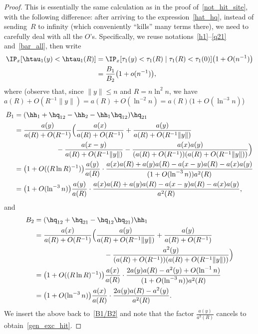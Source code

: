 \begin{proof}
This is essentially the same calculation as in the proof of~\eqref{not_hit_site}, with the following difference: after arriving to the expression~\eqref{hat_hq}, instead of sending~$R$ to infinity (which conveniently ``kills'' many terms there), we need to carefully deal with all the $O$'s. Specifically, we reuse notations~\eqref{h1}--\eqref{q21} and~\eqref{bar_all}, then write
\begin{align}
\IP_x[\htau_1(y)<\htau_1(R)] &= \IP_x[\tau_1(y)<\tau_1(R)\mid \tau_1(R)<\tau_1(0)]
\big(1+O(n^{-1})\big)\nonumber\\
&= \frac{B_1}{B_2}\big(1+o(n^{-1})\big),\label{B1/B2}
\end{align}
where (observe that, since $\|y\|\leq n$ and $R=n\ln^2 n$, we have $a(R)+O(R^{-1}\|y\|) =a(R)+O(\ln^{-2} n)=a(R)(1+O(\ln^{-3} n)$)
\begin{align*}
B_1 &= (\hh_1+\hq_{12}-\hh_2-\hh_1\hq_{12})\hq_{21}\\
&= \frac{a(y)}{a(R)+O(R^{-1})}
\Big(\frac{a(x)}{a(R)+O(R^{-1})}+\frac{a(y)}{a(R)+O(R^{-1}\|y\|)}\\
& \qquad \qquad \qquad -\frac{a(x-y)}{a(R)+O(R^{-1}\|y\|)} -\frac{a(x)a(y)}{(a(R)+O(R^{-1}))(a(R)+O(R^{-1}\|y\|))}\Big)\\
&= \big(1+O((R\ln R)^{-1})\big)
\frac{a(y)}{a(R)} \cdot
\frac{a(x)a(R)+a(y)a(R)-a(x-y)a(R)-a(x)a(y)}{(1+O(\ln^{-3} n))a^2(R)}\\
&= \big(1+O(\ln^{-3} n)\big)
\frac{a(y)}{a(R)} \cdot
\frac{a(x)a(R)+a(y)a(R)-a(x-y)a(R)-a(x)a(y)}{a^2(R)},
\end{align*}
and
\begin{align*}
B_2 &= (\hq_{12}+\hq_{21}-\hq_{12}\hq_{21})\hh_1\\
&= \frac{a(x)}{a(R)+O(R^{-1})}
\Big(\frac{a(y)}{a(R)+O(R^{-1}\|y\|)}+\frac{a(y)}{a(R)+O(R^{-1})}\\
& \qquad \qquad \qquad \qquad \qquad -\frac{a^2(y)}{(a(R)+O(R^{-1}))(a(R)+O(R^{-1}\|y\|))}\Big)\\
&=\big(1+O((R\ln R)^{-1})\big)
\frac{a(x)}{a(R)} \cdot
\frac{2a(y)a(R)-a^2(y)+O(\ln^{-1}n)}{(1+O(\ln^{-3} n))a^2(R)}\\
&= \big(1+O(\ln^{-3} n)\big)
\frac{a(x)}{a(R)} \cdot \frac{2a(y)a(R)-a^2(y)}{a^2(R)}.
\end{align*}
We insert the above back to~\eqref{B1/B2} and note that the factor $\frac{a(y)}{a^3(R)}$ cancels to obtain~\eqref{gen_exc_hit}.
\end{proof}


